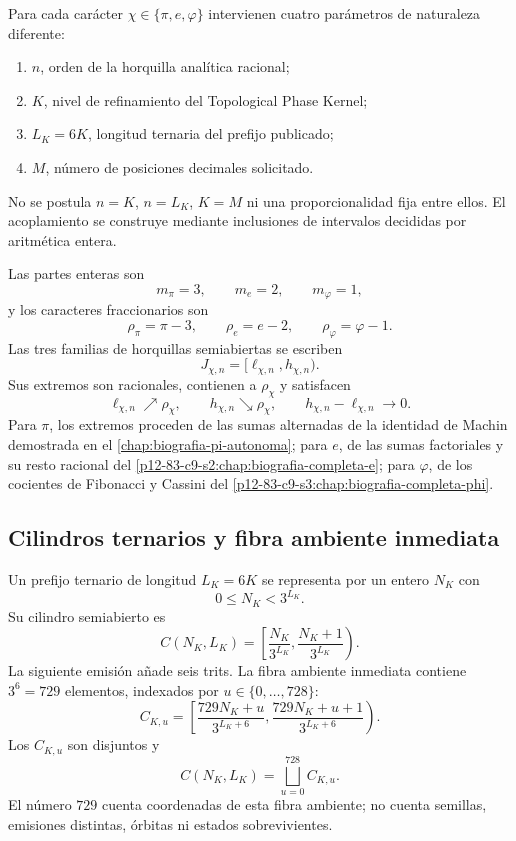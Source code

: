 Para cada carácter \(\chi\in\{\pi,e,\varphi\}\) intervienen cuatro
parámetros de naturaleza diferente:
\begin{enumerate}
 \item \(n\), orden de la horquilla analítica racional;
 \item \(K\), nivel de refinamiento del Topological Phase Kernel;
 \item \(L_K=6K\), longitud ternaria del prefijo publicado;
 \item \(M\), número de posiciones decimales solicitado.
\end{enumerate}
No se postula \(n=K\), \(n=L_K\), \(K=M\) ni una proporcionalidad fija
entre ellos. El acoplamiento se construye mediante inclusiones de intervalos
decididas por aritmética entera.

Las partes enteras son
\[
 m_\pi=3,
 \qquad
 m_e=2,
 \qquad
 m_\varphi=1,
\]
y los caracteres fraccionarios son
\[
 \rho_\pi=\pi-3,
 \qquad
 \rho_e=e-2,
 \qquad
 \rho_\varphi=\varphi-1.
\]
Las tres familias de horquillas semiabiertas se escriben
\[
 J_{\chi,n}=[\ell_{\chi,n},h_{\chi,n}).
\]
Sus extremos son racionales, contienen a \(\rho_\chi\) y satisfacen
\[
 \ell_{\chi,n}\nearrow\rho_\chi,
 \qquad
 h_{\chi,n}\searrow\rho_\chi,
 \qquad
 h_{\chi,n}-\ell_{\chi,n}\longrightarrow0.
\]
Para \(\pi\), los extremos proceden de las sumas alternadas de la identidad
de Machin demostrada en el \cref{chap:biografia-pi-autonoma}; para \(e\),
de las sumas factoriales y su resto racional del
\cref{p12-83-c9-s2:chap:biografia-completa-e}; para \(\varphi\), de los cocientes de
Fibonacci y Cassini del \cref{p12-83-c9-s3:chap:biografia-completa-phi}.

\subsection{Cilindros ternarios y fibra ambiente inmediata}

Un prefijo ternario de longitud \(L_K=6K\) se representa por un entero
\(N_K\) con
\[
 0\leq N_K<3^{L_K}.
\]
Su cilindro semiabierto es
\begin{equation}
 C(N_K,L_K)=
 \left[
 \frac{N_K}{3^{L_K}},
 \frac{N_K+1}{3^{L_K}}
 \right).
 \label{p12-83-c9-s4:eq:cilindro-nivel-K}
\end{equation}
La siguiente emisión añade seis trits. La fibra ambiente inmediata contiene
\(3^6=729\) elementos, indexados por \(u\in\{0,\ldots,728\}\):
\begin{equation}
 C_{K,u}=
 \left[
 \frac{729N_K+u}{3^{L_K+6}},
 \frac{729N_K+u+1}{3^{L_K+6}}
 \right).
 \label{p12-83-c9-s4:eq:729-subcilindros}
\end{equation}
Los \(C_{K,u}\) son disjuntos y
\[
 C(N_K,L_K)=\bigsqcup_{u=0}^{728}C_{K,u}.
\]
El número \(729\) cuenta coordenadas de esta fibra ambiente; no cuenta
semillas, emisiones distintas, órbitas ni estados sobrevivientes.

